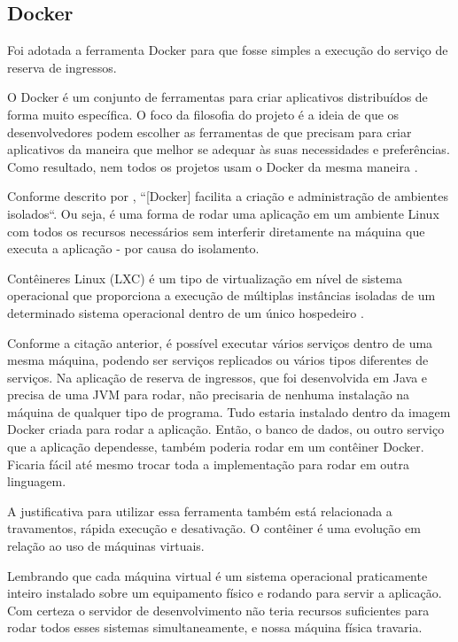 \subsection{Docker}\label{docker}

Foi adotada a ferramenta Docker para que fosse simples a execução do serviço de reserva de ingressos.

\begin{citacao}
O Docker é um conjunto de ferramentas para criar aplicativos distribuídos de forma muito específica.
O foco da filosofia do projeto é a ideia de que os desenvolvedores podem escolher as ferramentas
de que precisam para criar aplicativos da maneira que melhor se adequar às suas necessidades e preferências.
Como resultado, nem todos os projetos usam o Docker da mesma maneira \cite{solomon-hykes}.
\end{citacao}

Conforme descrito por , ``[Docker] facilita a criação e administração de ambientes isolados``.
Ou seja, é uma forma de rodar uma aplicação em um ambiente Linux com todos os recursos necessários sem interferir
diretamente na máquina que executa a aplicação - por causa do isolamento.

\begin{citacao}
Contêineres Linux (LXC) é um tipo de
virtualização em nível de sistema operacional que proporciona a execução de múltiplas instâncias isoladas de um determinado
sistema operacional dentro de um único hospedeiro \cite{sinestec-01}.
\end{citacao}

Conforme a citação anterior, é possível executar vários serviços dentro de uma mesma máquina, podendo ser serviços
replicados ou vários tipos diferentes de serviços.
Na aplicação de reserva de ingressos, que foi desenvolvida em Java e precisa de uma JVM para rodar, não precisaria
de nenhuma instalação na máquina de qualquer tipo de programa.
Tudo estaria instalado dentro da imagem Docker criada para rodar a aplicação.
Então, o banco de dados, ou outro serviço que a aplicação dependesse, também poderia rodar em um contêiner Docker.
Ficaria fácil até mesmo trocar toda a implementação para rodar em outra linguagem.

A justificativa para utilizar essa ferramenta também está relacionada a travamentos, rápida execução e desativação.
O contêiner é uma evolução em relação ao uso de máquinas virtuais.

\begin{citacao}
Lembrando que cada máquina virtual é um sistema operacional praticamente inteiro instalado sobre um equipamento físico e
rodando para servir a aplicação. Com certeza o servidor de desenvolvimento não teria recursos suficientes para rodar
todos esses sistemas simultaneamente, e nossa máquina física travaria\cite{aprendendo-docker}.
\end{citacao}


